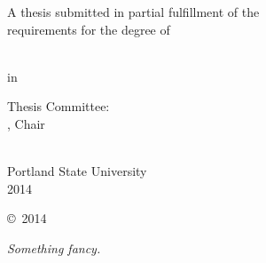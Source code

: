 \begin{SingleSpace}
\begin{center}
  A thesis submitted in partial fulfillment of the\\
  requirements for the degree of
\end{center}

\vfill

\begin{center}
  \thesisDegree\\
  in\\
  \thesisDept
\end{center}

\vfill

\begin{center}
  Thesis Committee:\\
  \thesisAdvisor, Chair\\
  \thesisCommitteeOne\\
  \thesisCommitteeTwo
\end{center}

\vfill

\begin{center}
    Portland State University\\
    2014
\end{center}
\end{SingleSpace}

\cleardoublepage    

\begin{center}
    \vspace*{2.5 in}
    \copyright~2014 \thesisAuthor
\end{center}

\cleardoublepage



\clearpage

\vspace*{\fill}
{\hfill\sffamily\itshape Something fancy.}  %


\rmfamily
\normalfont



\clearpage
 


\tableofcontents  %



\clearpage
\listoftables

\clearpage
\listoffigures


